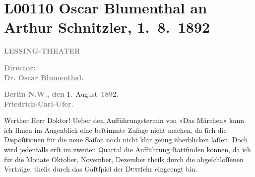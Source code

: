 

\section[Oscar Blumenthal an Arthur Schnitzler, 1. 8. 1892]{L00110 Oscar Blumenthal an Arthur Schnitzler, 1. 8. 1892}
\nopagebreak{}
\rehead{ }\normalsize\beginnumbering{}
\toendnotes[C]{\smallbreak\pagebreak[2]}
\pstart
           \centering{}{\pb}\textcolor{gray}{\textbf{LESSING-THEATER}}\pend
           
\pstart
           \centering{}\textcolor{gray}{\textbf{Director:}}{\\}\textcolor{gray}{\textbf{Dr. Oscar Blumenthal.}}\pend
           
\pstart
           \raggedleft{}\textcolor{gray}{\textbf{Berlin N.W., den}}{ }1. August \textcolor{gray}{\textbf{189}}2.{\\}\textcolor{gray}{\textbf{Friedrich-Carl-Ufer}}.\pend
           
\pstart\center{}Werther Herr Doktor!\pend\vspace{0.5em}
\pstart
           Ueber den Aufführungstermin von »Das Märchen«
               kann ich Ihnen im Augenblick eine beſtimmte Zuſage nicht machen, da ſich die
               Dispoſitionen für die neue Saiſon noch nicht klar genug überblicken laſſen. Doch wird
               jedenfalls erſt im zweiten Quartal die Aufführung ſtattfinden können, da
               ich für die Monate Oktober, November, Dezember
               theils durch die abgeſchloſſenen Verträge, theils durch das Gaſtſpiel der \textsc{Duse}ſehr eingeengt bin.\pend
           
